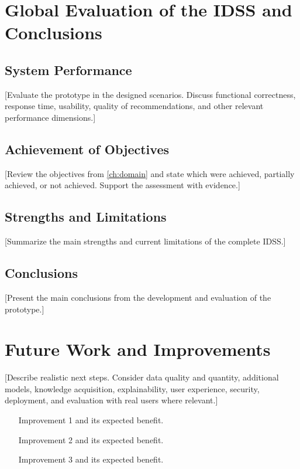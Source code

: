 \documentclass[12pt,a4paper]{report}
\begin{document}
\chapter{Global Evaluation of the IDSS and Conclusions}
\label{ch:evaluation}

\section{System Performance}
[Evaluate the prototype in the designed scenarios. Discuss functional correctness, response time, usability, quality of recommendations, and other relevant performance dimensions.]

\section{Achievement of Objectives}
[Review the objectives from \cref{ch:domain} and state which were achieved, partially achieved, or not achieved. Support the assessment with evidence.]

\section{Strengths and Limitations}
[Summarize the main strengths and current limitations of the complete IDSS.]

\section{Conclusions}
[Present the main conclusions from the development and evaluation of the prototype.]

\chapter{Future Work and Improvements}
\label{ch:future}

[Describe realistic next steps. Consider data quality and quantity, additional models, knowledge acquisition, explainability, user experience, security, deployment, and evaluation with real users where relevant.]

\begin{itemize}[leftmargin=*]
  \item [Improvement 1 and its expected benefit.]
  \item [Improvement 2 and its expected benefit.]
  \item [Improvement 3 and its expected benefit.]
\end{itemize}
\end{document}
